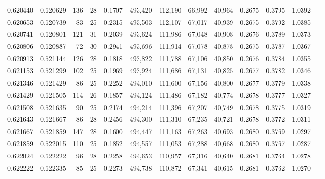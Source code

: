 \begin{tabular}{rrrrrrrrrrrrr}
0.620440 & 0.620629 &    136 &    28 &                                     0.1707 & 493,420 & 112,190 &  66,992 &  40,964 & 0.2675 & 0.3795 & 1.0392 \\
0.620653 & 0.620739 &     83 &    25 &                                     0.2315 & 493,503 & 112,107 &  67,017 &  40,939 & 0.2675 & 0.3792 & 1.0385 \\
0.620741 & 0.620801 &    121 &    31 &                                     0.2039 & 493,624 & 111,986 &  67,048 &  40,908 & 0.2676 & 0.3789 & 1.0373 \\
0.620806 & 0.620887 &     72 &    30 &                                     0.2941 & 493,696 & 111,914 &  67,078 &  40,878 & 0.2675 & 0.3787 & 1.0367 \\
0.620913 & 0.621144 &    126 &    28 &                                     0.1818 & 493,822 & 111,788 &  67,106 &  40,850 & 0.2676 & 0.3784 & 1.0355 \\
0.621153 & 0.621299 &    102 &    25 &                                     0.1969 & 493,924 & 111,686 &  67,131 &  40,825 & 0.2677 & 0.3782 & 1.0346 \\
0.621346 & 0.621429 &     86 &    25 &                                     0.2252 & 494,010 & 111,600 &  67,156 &  40,800 & 0.2677 & 0.3779 & 1.0338 \\
0.621429 & 0.621505 &    114 &    26 &                                     0.1857 & 494,124 & 111,486 &  67,182 &  40,774 & 0.2678 & 0.3777 & 1.0327 \\
0.621508 & 0.621635 &     90 &    25 &                                     0.2174 & 494,214 & 111,396 &  67,207 &  40,749 & 0.2678 & 0.3775 & 1.0319 \\
0.621643 & 0.621667 &     86 &    28 &                                     0.2456 & 494,300 & 111,310 &  67,235 &  40,721 & 0.2678 & 0.3772 & 1.0311 \\
0.621667 & 0.621859 &    147 &    28 &                                     0.1600 & 494,447 & 111,163 &  67,263 &  40,693 & 0.2680 & 0.3769 & 1.0297 \\
0.621859 & 0.622015 &    110 &    25 &                                     0.1852 & 494,557 & 111,053 &  67,288 &  40,668 & 0.2680 & 0.3767 & 1.0287 \\
0.622024 & 0.622222 &     96 &    28 &                                     0.2258 & 494,653 & 110,957 &  67,316 &  40,640 & 0.2681 & 0.3764 & 1.0278 \\
0.622222 & 0.622335 &     85 &    25 &                                     0.2273 & 494,738 & 110,872 &  67,341 &  40,615 & 0.2681 & 0.3762 & 1.0270 \\

\end{tabular}
